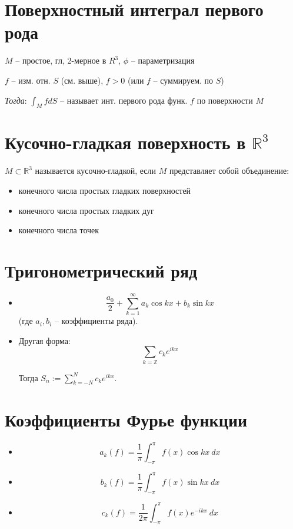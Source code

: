 \documentclass[paper=a4, fontsize=14pt]{report}
\begin{document}
	\section{Поверхностный интеграл первого рода}
        
        $ M $ -- простое, гл, 2-мерное в $ R^3 $, $ \phi $ -- параметризация

	$ f $ -- изм. отн. $S$ (см. выше), $ f > 0 $ (или $ f $ -- суммируем. по $ S $)

        \emph{Тогда}: $ \int_M f dS$ -- называет инт. первого рода функ. $ f $ по поверхности $M$

	\section{Кусочно-гладкая поверхность в $\mathds{R}^3$}
	
        $M \subset \mathbb R^3$ называется кусочно-гладкой, если $M$ представляет собой объединение:

    \begin{itemize}
	    \item конечного числа простых гладких поверхностей
	    \item конечного числа простых гладких дуг
	    \item конечного числа точек
    \end{itemize}

	\section{Тригонометрический ряд}

	\begin{itemize}
		\item $$ \frac{a_0}{2}  + \sum_{k = 1}^{\infty} a_k\cos kx + b_k\sin kx $$
		(где $ a_i, b_i $ -- коэффициенты ряда).

		\item Другая форма:	$$ \sum_{k = \mathbb{Z}} c_k e^{ikx} $$

		Тогда $ S_n := \sum_{k = -N}^{N} c_k e^{ikx} $.
	\end{itemize}

	\section{Коэффициенты Фурье функции}

	\begin{itemize}
		\item $$ a_k(f) = \frac{1}{\pi} \int_{-\pi}^{\pi} f(x) \cos kx ~ dx $$

		\item $$ b_k(f) = \frac{1}{\pi} \int_{-\pi}^{\pi} f(x) \sin kx ~ dx $$

		\item $$ c_k(f) = \frac{1}{2\pi} \int_{-\pi}^{\pi} f(x) e^{-ikx} ~ dx $$

	\end{itemize}
\end{document}
